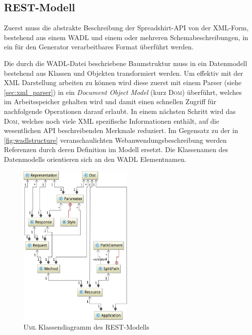 \subsection{REST-Modell}
\label{sec:rest_model}

Zuerst muss die abstrakte Beschreibung der Spreadshirt-\gls{API} von der \gls{XML}-Form, bestehend aus einem \gls{WADL} und einem oder mehreren Schemabeschreibungen, in ein für den Generator verarbeitbares Format überführt werden.

Die durch die \gls{WADL}-Datei beschriebene Baumstruktur muss in ein Datenmodell bestehend aus Klassen und Objekten transformiert werden.
Um effektiv mit der \gls{XML} Darstellung arbeiten zu können wird diese zuerst mit einem Parser (siehe \cref{sec:xml_parser}) in ein \emph{Document Object Model} (kurz \textsc{Dom}) überführt, welches im Arbeitsspeicher gehalten wird und damit einen schnellen Zugriff für nachfolgende Operationen darauf erlaubt. In einem nächsten Schritt wird das \textsc{Dom}, welches noch viele \gls{XML} spezifische Informationen enthält, auf die wesentlichen \gls{API} beschreibenden Merkmale reduziert. Im Gegensatz zu der in \cref{fig:wadlstructure} veranschaulichten Webanwendungsbeschreibung werden Referenzen durch deren Definition im Modell ersetzt. Die Klassenamen des Datenmodells orientieren sich an den \gls{WADL} Elementnamen.

\begin{figure}[tb]
    \centering
    \includegraphics[width=0.5\textwidth]{resources/restmodel}
    \caption{\textsc{Uml} Klassendiagramm des \gls{REST}-Modells}
    \label{fig:restmodel}
\end{figure}

